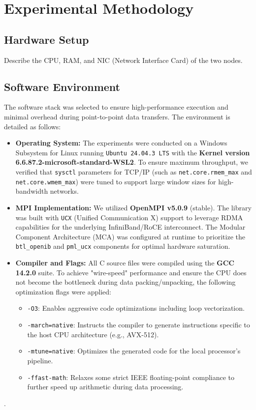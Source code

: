 \documentclass[11pt,a4paper]{article}
\begin{document}
	\section{Experimental Methodology}
	\label{sec:methodology}
	
	\subsection{Hardware Setup}
	Describe the CPU, RAM, and NIC (Network Interface Card) of the two nodes.
	
	\subsection{Software Environment}
	The software stack was selected to ensure high-performance execution and minimal overhead during point-to-point data transfers. The environment is detailed as follows:
	
	\begin{itemize} 
		\item \textbf{Operating System:} The experiments were conducted on a Windows Subsystem for Linux running \texttt{Ubuntu 24.04.3 LTS} with the \textbf{Kernel version 6.6.87.2-microsoft-standard-WSL2}. To ensure maximum throughput, we verified that \texttt{sysctl} parameters for TCP/IP (such as \texttt{net.core.rmem\_max} and \texttt{net.core.wmem\_max}) were tuned to support large window sizes for high-bandwidth networks.
		
		\item \textbf{MPI Implementation:} We utilized \textbf{OpenMPI v5.0.9} (stable). The library was built with \texttt{UCX} (Unified Communication X) support to leverage RDMA capabilities for the underlying InfiniBand/RoCE interconnect. The Modular Component Architecture (MCA) was configured at runtime to prioritize the \texttt{btl\_openib} and \texttt{pml\_ucx} components for optimal hardware saturation.
		
		\item \textbf{Compiler and Flags:} All C source files were compiled using the \textbf{GCC 14.2.0} suite. To achieve "wire-speed" performance and ensure the CPU does not become the bottleneck during data packing/unpacking, the following optimization flags were applied:
		\begin{itemize}
			\item \texttt{-O3}: Enables aggressive code optimizations including loop vectorization.
			\item \texttt{-march=native}: Instructs the compiler to generate instructions specific to the host CPU architecture (e.g., AVX-512).
			\item \texttt{-mtune=native}: Optimizes the generated code for the local processor's pipeline.
			\item \texttt{-ffast-math}: Relaxes some strict IEEE floating-point compliance to further speed up arithmetic during data processing.
		\end{itemize}
	\end{itemize}
	.
\end{document}

